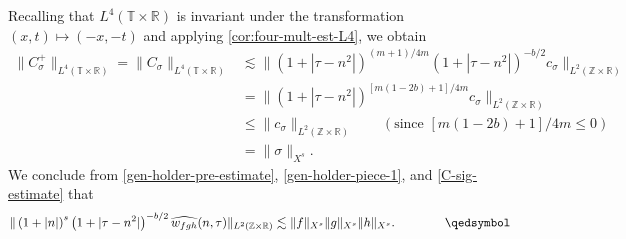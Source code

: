\documentclass[12pt,reqno]{amsart}
\numberwithin{equation}{section}  %
\numberwithin{figure}{section}
\newcommand{\rr}{\mathbb{R}}
\newcommand{\zz}{\mathbb{Z}}
\newcommand{\ci}{\mathbb{T}}
\newcommand{\wh}{\widehat}
\renewcommand{\qed}{\qquad \qedsymbol} %
\theoremstyle{plain}
\theoremstyle{definition}
\theoremstyle{remark}
\begin{document}
%
%
Recalling that $L^4(\ci \times \rr)$ is invariant under the transformation $(x, 
t) \mapsto (-x,-t)$ and applying 
\cref{cor:four-mult-est-L4}, we obtain
%
%
\begin{equation}
  \label{C-sig-estimate}
  \begin{split}
    \| C^+_\sigma \|_{L^4(\ci \times \rr)} = \|C_\sigma \|_{L^4(\ci \times \rr)} 
    & \lesssim \|\left( 1 + | \tau - n^{2} | 
    \right)^{(m +1)/4m} \left( 1 + | \tau - n^{2} | 
    \right)^{-b/2} c_\sigma \|_{L^2(\zz \times \rr)}
    \\
    & = \|\left( 1 + | \tau - n^{2} | 
    \right)^{[m(1 - 2b) + 1]/4m } c_\sigma \|_{L^2(\zz \times \rr)}
    \\
    & \le \|c_\sigma \|_{L^2(\zz \times \rr)}  \qquad (\text{since  } [m(1 - 2b) + 
    1]/4m \le 0 )
    \\
    & = \|\sigma\|_{X^s}.
  \end{split}
\end{equation}
%
%
We conclude from \eqref{gen-holder-pre-estimate}, \eqref{gen-holder-piece-1}, 
and \eqref{C-sig-estimate} that
%
%
%
%
\begin{equation*}
  \begin{split}
    \| \left( 1 + |n | \right)^s \left( 1 + | \tau - n^{2} | \right)^{-b/2} \wh{{w}_{fgh}} 
    (n, \tau) \|_{L^2(\zz \times \rr)} \lesssim 
    \|f\|_{X^s}\|g\|_{X^s}\|h\|_{X^s}. \qquad \qed
  \end{split}
\end{equation*}
%
%
%
%
%
%
%
\end{document}
